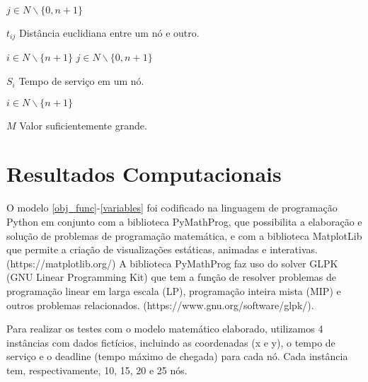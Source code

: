 \documentclass[12pt]{article}
\begin{document}
\hspace{1.27cm} $j\in N\backslash \{0,n+1\}$

$t_{ij}$ Distância euclidiana entre um nó e outro.

\hspace{1.27cm} $i\in N\backslash \{n+1\}$ \hspace{1.27cm}  $j\in N\backslash \{0,n+1\}$

$S_i$ Tempo de serviço em um nó.

\hspace{1.27cm} $i\in N\backslash \{n+1\}$

$M$ Valor suficientemente grande.

\section{Resultados Computacionais}
O modelo \eqref{obj_func}-\eqref{variables} foi codificado na linguagem de
programação Python em conjunto com a biblioteca PyMathProg, que possibilita a
elaboração e solução de problemas de programação matemática, e com a biblioteca
MatplotLib que permite a criação de visualizações estáticas, animadas e
interativas.(https://matplotlib.org/) A biblioteca PyMathProg faz uso do solver
GLPK (GNU Linear Programming Kit) que tem a função de resolver problemas de
programação linear em larga escala (LP), programação inteira mista (MIP) e
outros problemas relacionados. (https://www.gnu.org/software/glpk/).

Para realizar os testes com o modelo matemático elaborado, utilizamos 4
instâncias com dados fictícios, incluindo as coordenadas (x e y), o tempo de
serviço e o deadline (tempo máximo de chegada) para cada nó. Cada instância
tem, respectivamente, 10, 15, 20 e 25 nós.

\end{document}
